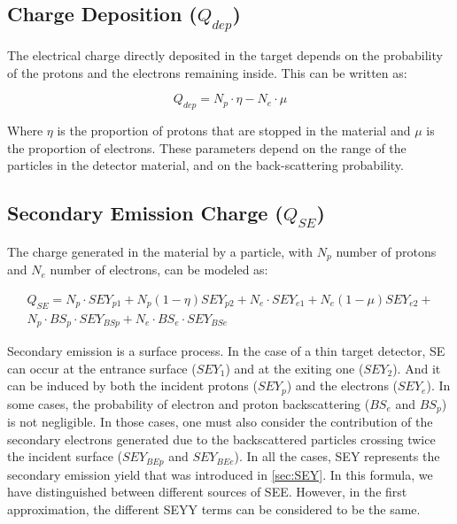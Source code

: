 \subsection{Charge Deposition ($Q_{dep}$)}

The electrical charge directly deposited in the target depends on the probability of the protons and the electrons remaining inside. This can be written as: 

\begin{equation}
    Q_{dep} = N_p \cdot \eta - N_{e}\cdot \mu
\end{equation}

Where $\eta$ is the proportion of protons that are stopped in the material and $\mu$ is the proportion of electrons. These parameters depend on the range of the particles in the detector material, and on the back-scattering probability. 

\subsection{Secondary Emission Charge ($Q_{SE}$)} 

The charge generated in the material by a particle, with $N_p$ number of protons and $N_e$ number of electrons, can be modeled as: 

\begin{equation}
    \begin{split}
        Q_{SE} = N_p \cdot SEY_{p1} + N_p \left(1-\eta\right)SEY_{p2} + 
                N_e \cdot SEY_{e1} + N_e \left( 1 - \mu \right) SEY_{e2} + \\
                N_p \cdot BS_p \cdot SEY_{BSp} + N_e \cdot BS_e \cdot SEY_{BSe}
    \end{split}
    \label{eq:Qse}
\end{equation}

Secondary emission is a surface process. In the case of a thin target detector, SE can occur at the entrance surface ($SEY_1$) and at the exiting one ($SEY_2$). And it can be induced by both the incident protons ($SEY_p$) and the electrons ($SEY_e$). In some cases, the probability of electron and proton backscattering ($BS_e$ and $BS_p$) is not negligible. In those cases, one must also consider the contribution of the secondary electrons generated due to the backscattered particles crossing twice the incident surface ($SEY_{BEp}$ and $SEY_{BEe}$). In all the cases, SEY represents the secondary emission yield that was introduced in \ref{sec:SEY}. In this formula, we have distinguished between different sources of SEE. However, in the first approximation, the different SEYY terms can be considered to be the same. 

